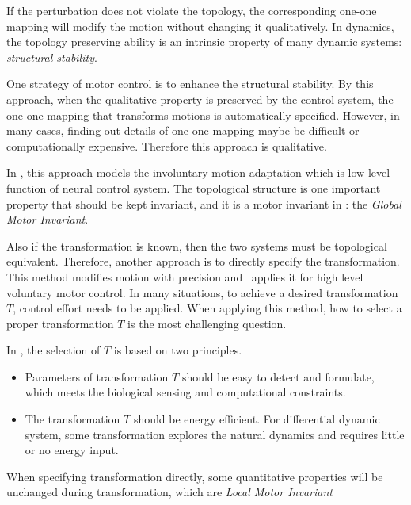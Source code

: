 If the perturbation does not violate the topology, the corresponding one-one mapping will modify the motion without changing it qualitatively.
In dynamics, the topology preserving ability is an intrinsic property of many dynamic systems:
\emph{structural stability}.

One strategy of motor control is to enhance the structural stability. 
By this approach, when the qualitative property is preserved by the control system, the one-one mapping that transforms motions is automatically specified. 
However, in many cases, finding out details of one-one mapping maybe be difficult or computationally expensive.
Therefore this approach is qualitative.

In {\moit}, this approach models the involuntary motion adaptation which is low level function of neural control system.
The topological structure is one important property that should be kept invariant, and it is a motor invariant in {\moit}: the \emph{Global Motor Invariant}.






Also if the transformation is known, then the two systems must be topological equivalent.
Therefore, another approach is to directly specify the transformation.
This method  modifies motion with precision and {\moit}\ applies it for high level voluntary motor control.
In many situations, to achieve a desired transformation $T$, control effort needs to be applied.
When applying this method, how to select a proper transformation $T$ is the most challenging  question.

In {\moit}, the selection of $T$ is based on two principles.
\begin{itemize}
\item
Parameters of transformation $T$ should be easy to detect and formulate, which meets the biological sensing and computational constraints. 

\item 
The transformation $T$ should be energy efficient.
For differential dynamic system, some transformation explores the natural dynamics and requires little or no energy input.
\end{itemize}

When specifying transformation directly, some quantitative properties will be unchanged during transformation, which are \emph{Local Motor Invariant}






%
%
%
%
%




